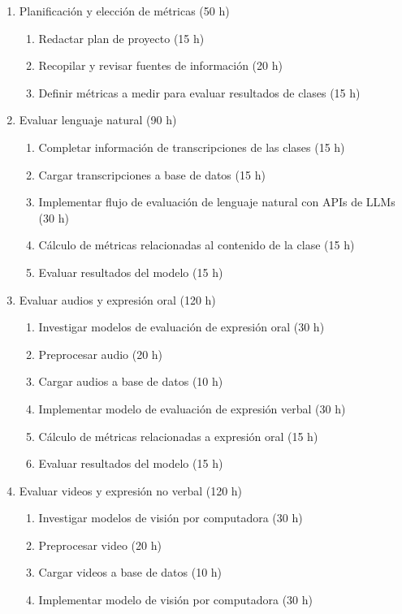 \documentclass[
11pt, %
codirector, %
]{charter}
\begin{document}
\begin{enumerate}
\item Planificación y elección de métricas (50 h)
    \begin{enumerate}
    \item Redactar plan de proyecto (15 h)
    \item Recopilar y revisar fuentes de información (20 h)
    \item Definir métricas a medir para evaluar resultados de clases (15 h)
    \end{enumerate}
\item Evaluar lenguaje natural (90 h)
    \begin{enumerate}
    \item Completar información de transcripciones de las clases (15 h)
    \item Cargar transcripciones a base de datos (15 h)
    \item Implementar flujo de evaluación de lenguaje natural con APIs de LLMs (30 h)
    \item Cálculo de métricas relacionadas al contenido de la clase (15 h)
    \item Evaluar resultados del modelo (15 h)
    \end{enumerate}
\item Evaluar audios y expresión oral (120 h)
    \begin{enumerate}
    \item Investigar modelos de evaluación de expresión oral (30 h)
    \item Preprocesar audio (20 h)
    \item Cargar audios a base de datos (10 h)
    \item Implementar modelo de evaluación de expresión verbal (30 h)
    \item Cálculo de métricas relacionadas a expresión oral (15 h)
    \item Evaluar resultados del modelo (15 h)
    \end{enumerate}
\item Evaluar videos y expresión no verbal (120 h)
    \begin{enumerate}
    \item Investigar modelos de visión por computadora (30 h)
    \item Preprocesar video (20 h)
    \item Cargar videos a base de datos (10 h)
    \item Implementar modelo de visión por computadora (30 h)

\end{enumerate}
\end{enumerate}
\end{document}
